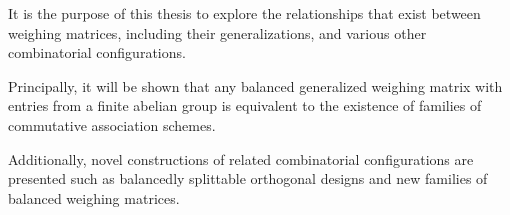 \documentclass[../../main]{subfiles}
\begin{document}
It is the purpose of this thesis to explore the relationships that exist between weighing matrices, including their generalizations, and various other combinatorial configurations.

Principally, it will be shown that any balanced generalized weighing matrix with entries from a finite abelian group is equivalent to the existence of families of commutative association schemes.

Additionally, novel constructions of related combinatorial configurations are presented such as balancedly splittable orthogonal designs and new families of balanced weighing matrices.
\end{document}
